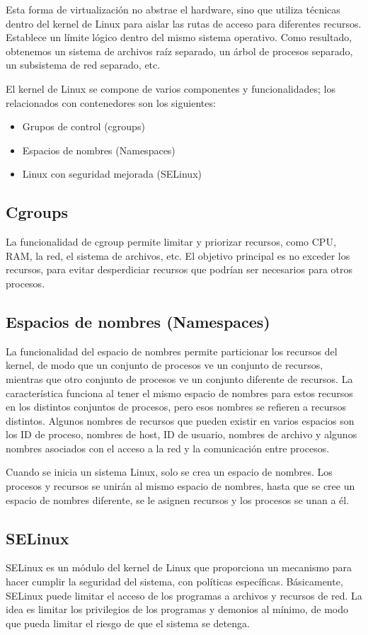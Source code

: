 Esta forma de virtualización no abstrae el hardware, sino que utiliza técnicas 
dentro del kernel de Linux para aislar las rutas de acceso para diferentes recursos. 
Establece un límite lógico dentro del mismo sistema operativo. Como resultado, obtenemos 
un sistema de archivos raíz separado, un árbol de procesos separado, un subsistema 
de red separado, etc.

El kernel de Linux se compone de varios componentes y funcionalidades; los relacionados 
con contenedores son los siguientes:
\begin{itemize}
    \item Grupos de control (cgroups)
    \item Espacios de nombres (Namespaces)
    \item Linux con seguridad mejorada (SELinux)
\end{itemize}

\subsection*{Cgroups}
La funcionalidad de cgroup permite limitar y priorizar recursos, como CPU, RAM, 
la red, el sistema de archivos, etc. El objetivo principal es no exceder los 
recursos, para evitar desperdiciar recursos que podrían ser necesarios para 
otros procesos.

\subsection*{Espacios de nombres (Namespaces)}
La funcionalidad del espacio de nombres permite particionar los recursos del kernel, 
de modo que un conjunto de procesos ve un conjunto de recursos, mientras que otro 
conjunto de procesos ve un conjunto diferente de recursos. La característica funciona 
al tener el mismo espacio de nombres para estos recursos en los distintos conjuntos 
de procesos, pero esos nombres se refieren a recursos distintos. Algunos nombres 
de recursos que pueden existir en varios espacios son los ID de proceso, nombres 
de host, ID de usuario, nombres de archivo y algunos nombres asociados con el 
acceso a la red y la comunicación entre procesos. 

Cuando se inicia un sistema 
Linux, solo se crea un espacio de nombres. Los procesos y recursos se unirán 
al mismo espacio de nombres, hasta que se cree un espacio de nombres diferente, 
se le asignen recursos y los procesos se unan a él.

\subsection*{SELinux}
SELinux es un módulo del kernel de Linux que proporciona un mecanismo para hacer 
cumplir la seguridad del sistema, con políticas específicas. Básicamente, SELinux 
puede limitar el acceso de los programas a archivos y recursos de red. La idea es 
limitar los privilegios de los programas y demonios al mínimo, de modo que pueda 
limitar el riesgo de que el sistema se detenga.


